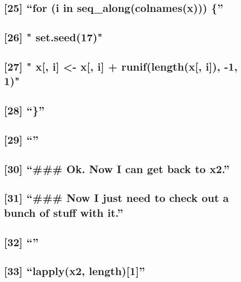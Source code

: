 \documentclass[]{article}
\begin{document}
\subsection{\texorpdfstring{{[}25{]} ``for (i in
seq\_along(colnames(x)))
\{''}{{[}25{]} for (i in seq\_along(colnames(x))) \{}}\label{for-i-in-seq_alongcolnamesx}

\subsection{{[}26{]} " set.seed(17)"}\label{set.seed17}

\subsection{{[}27{]} " x{[}, i{]} \textless{}- x{[}, i{]} +
runif(length(x{[}, i{]}), -1, 1)"}\label{x-i---x-i-runiflengthx-i--1-1}

\subsection{\texorpdfstring{{[}28{]}
``\}''}{{[}28{]} \}}}\label{section-5}

\subsection{\texorpdfstring{{[}29{]} ``''}{{[}29{]} }}\label{section-6}

\subsection{\texorpdfstring{{[}30{]} ``\#\#\# Ok. Now I can get back to
x2.''}{{[}30{]} \#\#\# Ok. Now I can get back to x2.}}\label{ok.-now-i-can-get-back-to-x2.}

\subsection{\texorpdfstring{{[}31{]} ``\#\#\# Now I just need to check
out a bunch of stuff with
it.''}{{[}31{]} \#\#\# Now I just need to check out a bunch of stuff with it.}}\label{now-i-just-need-to-check-out-a-bunch-of-stuff-with-it.}

\subsection{\texorpdfstring{{[}32{]} ``''}{{[}32{]} }}\label{section-7}

\subsection{\texorpdfstring{{[}33{]} ``lapply(x2,
length){[}1{]}''}{{[}33{]} lapply(x2, length){[}1{]}}}\label{lapplyx2-length1}
\end{document}
